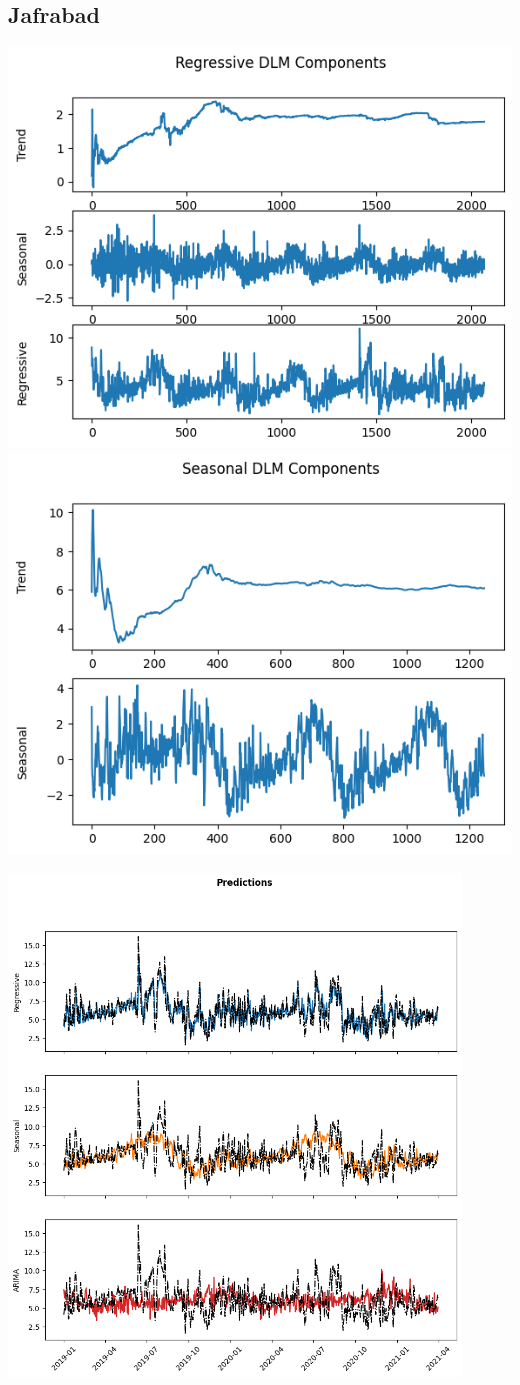 \documentclass[a4paper,12pt]{article}
\begin{document}
\pagebreak

\subsection{Jafrabad}
\label{sec:org7f10659}
\begin{center}
\includegraphics[width=0.45\linewidth]{./images/jafrabad/reg.png}
\includegraphics[width=0.45\linewidth]{./images/jafrabad/seas.png}
\end{center}

\begin{center}
\includegraphics[width=0.9\textwidth]{./images/jafrabad/pred.png}
\end{center}
\end{document}
